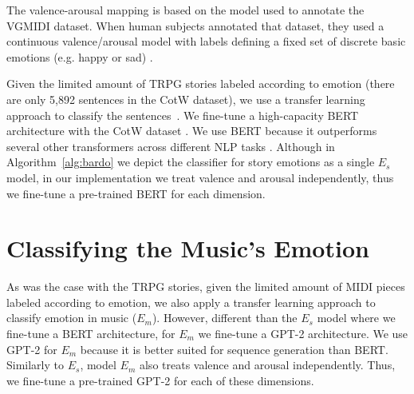 The valence-arousal mapping is based on the model used to annotate the VGMIDI dataset. When human subjects annotated that dataset, they used a continuous valence/arousal model with labels defining a fixed set of discrete basic emotions (e.g. happy or sad) \cite{ferreira_2019}.




Given the limited amount of TRPG stories labeled according
to emotion (there are only 5,892 sentences in the CotW dataset), we use a transfer learning
approach to classify
the sentences~\cite{Radford2018}. We fine-tune a high-capacity BERT architecture with the CotW dataset  \cite{devlin2018bert}. We use BERT because it outperforms
several other transformers across different NLP tasks \cite{devlin2018bert}.
Although in Algorithm~\ref{alg:bardo} we depict the classifier for story emotions as a single $E_s$ model,
in our implementation we treat valence and arousal independently, thus we
fine-tune a pre-trained BERT for each dimension.



\section{Classifying the Music's Emotion}


As was the case with the TRPG stories, given the limited amount of MIDI pieces
labeled according to emotion, we also apply a transfer
learning approach to classify emotion in music ($E_m$).
However, different than the $E_s$ model
where we fine-tune a BERT architecture, for $E_m$ we fine-tune a GPT-2 architecture\cite{radford2019language}.
We use GPT-2 for $E_m$ because it is better suited for sequence generation than BERT.
Similarly to $E_s$, model $E_m$ also treats valence and arousal independently.
Thus, we fine-tune a pre-trained GPT-2 for each of these
dimensions.

